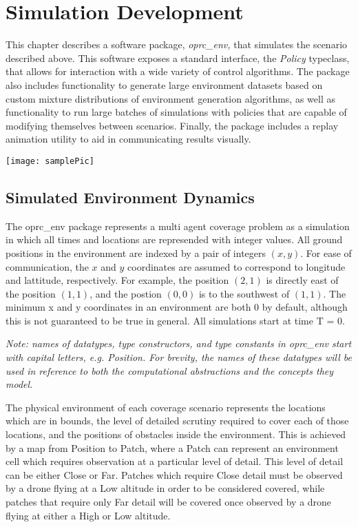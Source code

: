 \chapter{Simulation Development}

This chapter describes a software package, \textit{oprc\_env,} that simulates the scenario described above. This software exposes a standard interface, the \textit{Policy} typeclass, that allows for interaction with a wide variety of control algorithms. The package also includes functionality to generate large environment datasets based on custom mixture distributions of environment generation algorithms, as well as functionality to run large batches of simulations with policies that are capable of modifying themselves between scenarios. Finally, the package includes a replay animation utility to aid in communicating results visually.

\texttt{[image: samplePic]}

\section{Simulated Environment Dynamics}

The oprc\_env package represents a multi agent coverage problem as a simulation in which all times and locations are represended with integer values. All ground positions in the environment are indexed by a pair of integers $ (x, y) $. For ease of communication, the $x$ and $y$ coordinates are assumed to correspond to longitude and lattitude, respectively. For example, the position $(2, 1)$ is directly east of the position $(1, 1)$, and the postion $(0, 0)$ is to the southwest of $(1, 1)$. The minimum x and y coordinates in an environment are both 0 by default, although this is not guaranteed to be true in general. All simulations start at time T = 0.

\textit{Note: names of datatypes, type constructors, and type constants in oprc\_env start with capital letters, e.g. Position. For brevity, the names of these datatypes will be used in reference to both the computational abstractions and the concepts they model.}

The physical environment of each coverage scenario represents the locations which are in bounds, the level of detailed scrutiny required to cover each of those locations, and the positions of obstacles inside the environment. This is achieved by a map from Position to Patch, where a Patch can represent an environment cell which requires observation at a particular level of detail. This level of detail can be either Close or Far. Patches which require Close detail must be observed by a drone flying at a Low altitude in order to be considered covered, while patches that require only Far detail will be covered once observed by a drone flying at either a High or Low altitude.

